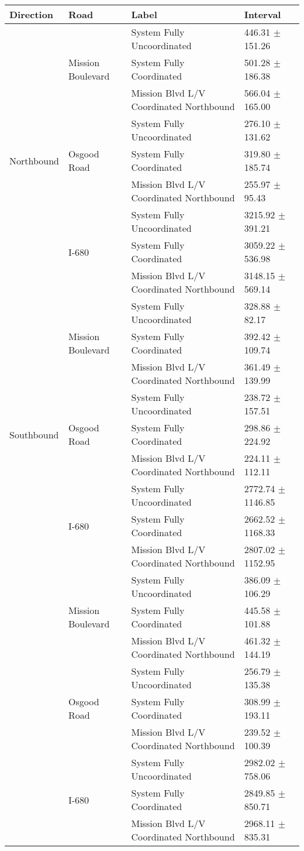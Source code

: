 \begin{tabular}{llll}
\toprule
Direction & Road & Label & Interval \\
\midrule
\multirow[t]{9}{*}{Northbound} & \multirow[t]{3}{*}{Mission Boulevard} & System Fully Uncoordinated & 446.31 $\pm$ 151.26 \\
 &  & System Fully Coordinated & 501.28 $\pm$ 186.38 \\
 &  & Mission Blvd L/V Coordinated Northbound & 566.04 $\pm$ 165.00 \\
 & \multirow[t]{3}{*}{Osgood Road} & System Fully Uncoordinated & 276.10 $\pm$ 131.62 \\
 &  & System Fully Coordinated & 319.80 $\pm$ 185.74 \\
 &  & Mission Blvd L/V Coordinated Northbound & 255.97 $\pm$ 95.43 \\
 & \multirow[t]{3}{*}{I-680} & System Fully Uncoordinated & 3215.92 $\pm$ 391.21 \\
 &  & System Fully Coordinated & 3059.22 $\pm$ 536.98 \\
 &  & Mission Blvd L/V Coordinated Northbound & 3148.15 $\pm$ 569.14 \\
\multirow[t]{9}{*}{Southbound} & \multirow[t]{3}{*}{Mission Boulevard} & System Fully Uncoordinated & 328.88 $\pm$ 82.17 \\
 &  & System Fully Coordinated & 392.42 $\pm$ 109.74 \\
 &  & Mission Blvd L/V Coordinated Northbound & 361.49 $\pm$ 139.99 \\
 & \multirow[t]{3}{*}{Osgood Road} & System Fully Uncoordinated & 238.72 $\pm$ 157.51 \\
 &  & System Fully Coordinated & 298.86 $\pm$ 224.92 \\
 &  & Mission Blvd L/V Coordinated Northbound & 224.11 $\pm$ 112.11 \\
 & \multirow[t]{3}{*}{I-680} & System Fully Uncoordinated & 2772.74 $\pm$ 1146.85 \\
 &  & System Fully Coordinated & 2662.52 $\pm$ 1168.33 \\
 &  & Mission Blvd L/V Coordinated Northbound & 2807.02 $\pm$ 1152.95 \\
\multirow[t]{9}{*}{} & \multirow[t]{3}{*}{Mission Boulevard} & System Fully Uncoordinated & 386.09 $\pm$ 106.29 \\
 &  & System Fully Coordinated & 445.58 $\pm$ 101.88 \\
 &  & Mission Blvd L/V Coordinated Northbound & 461.32 $\pm$ 144.19 \\
 & \multirow[t]{3}{*}{Osgood Road} & System Fully Uncoordinated & 256.79 $\pm$ 135.38 \\
 &  & System Fully Coordinated & 308.99 $\pm$ 193.11 \\
 &  & Mission Blvd L/V Coordinated Northbound & 239.52 $\pm$ 100.39 \\
 & \multirow[t]{3}{*}{I-680} & System Fully Uncoordinated & 2982.02 $\pm$ 758.06 \\
 &  & System Fully Coordinated & 2849.85 $\pm$ 850.71 \\
 &  & Mission Blvd L/V Coordinated Northbound & 2968.11 $\pm$ 835.31 \\
\bottomrule
\end{tabular}

